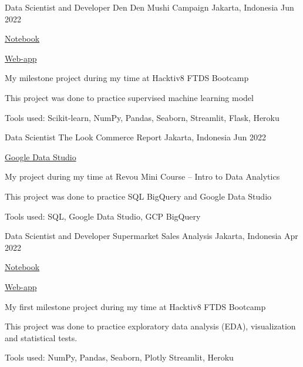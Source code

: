 \begin{cventries}
  \cventry
    {Data Scientist and Developer} %
    {Den Den Mushi Campaign} %
    {Jakarta, Indonesia} %
    {Jun 2022} %
    {
      \begin{cvitems} %
        \item {\href{https://github.com/NikkiSatmaka/dendenmushi-campaign/blob/main/h8dsft_Milestone2P1_nikki_satmaka.ipynb}{Notebook}}
        \item {\href{https://dendenmushi-campaign.herokuapp.com/}{Web-app}}
        \item {My milestone project during my time at Hacktiv8 FTDS Bootcamp}
        \item {This project was done to practice supervised machine learning model}
        \item {Tools used: Scikit-learn, NumPy, Pandas, Seaborn, Streamlit, Flask, Heroku}
      \end{cvitems}
    }

  \cventry
    {Data Scientist} %
    {The Look Commerce Report} %
    {Jakarta, Indonesia} %
    {Jun 2022} %
    {
      \begin{cvitems} %
        \item {\href{https://datastudio.google.com/s/vI4f1mokRRo}{Google Data Studio}}
        \item {My project during my time at Revou Mini Course – Intro to Data Analytics}
        \item {This project was done to practice SQL BigQuery and Google Data Studio}
        \item {Tools used: SQL, Google Data Studio, GCP BigQuery}
      \end{cvitems}
    }

  \cventry
    {Data Scientist and Developer} %
    {Supermarket Sales Analysis} %
    {Jakarta, Indonesia} %
    {Apr 2022} %
    {
      \begin{cvitems} %
        \item {\href{https://github.com/NikkiSatmaka/supermarket-sales-analysis/blob/main/h8dsft_Milestone1_nikki_satmaka.ipynb}{Notebook}}
        \item {\href{https://nikki-satmaka-ftds-011-p0m1.herokuapp.com/}{Web-app}}
        \item {My first milestone project during my time at Hacktiv8 FTDS Bootcamp}
        \item {This project was done to practice exploratory data analysis (EDA), visualization and statistical tests.}
        \item {Tools used: NumPy, Pandas, Seaborn, Plotly Streamlit, Heroku}
      \end{cvitems}
    }

\end{cventries}
